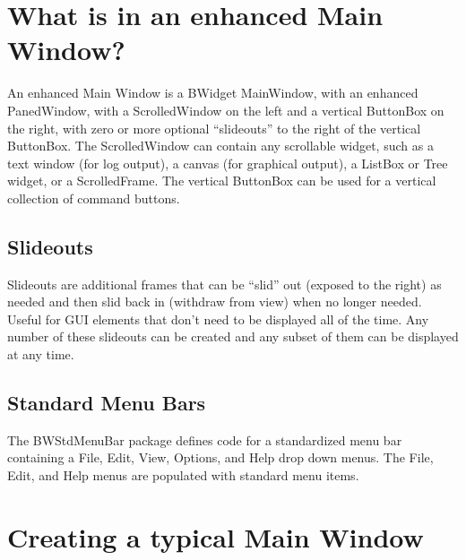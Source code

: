 \section{What is in an enhanced Main Window?}
\label{sec:Main:WhatIsIn}

An enhanced Main Window is a BWidget MainWindow, with an enhanced PanedWindow, with a ScrolledWindow on the left and a vertical
ButtonBox on the right, with zero
or more optional ``slideouts'' to the right of the vertical ButtonBox. 
The ScrolledWindow can contain any scrollable widget, such as a text
window (for log output), a canvas (for graphical output), a ListBox or
Tree widget, or a ScrolledFrame.  The vertical ButtonBox can be used
for a vertical collection of command buttons.

\subsection{Slideouts}
\label{sec:Main:Slideouts}

Slideouts are additional frames that can
be ``slid'' out (exposed to the right) as needed and then slid back in
(withdraw from view) when no longer needed.  Useful for GUI elements
that don't need to be displayed all of the time.  Any number of these
slideouts can be created and any subset of them can be displayed at any
time.

\subsection{Standard Menu Bars}
\label{sec:Main:StdMenuBar}

The BWStdMenuBar package
defines code for a standardized menu bar containing a File, Edit, View,
Options, and Help drop down menus.  The File, Edit, and Help menus are
populated with standard menu items.


\section{Creating a typical Main Window}
\label{sec:Main:SampleMainWindow}


